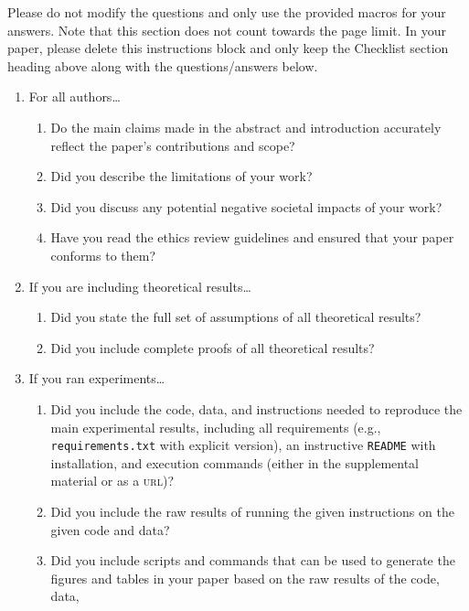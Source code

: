 \documentclass[11pt]{article}
\begin{document}
Please do not modify the questions and only use the provided macros for your
answers. Note that this section does not count towards the page limit. In your
paper, please delete this instructions block and only keep the Checklist section
heading above along with the questions/answers below.
\begin{enumerate}
\item For all authors\dots
  \begin{enumerate}
  \item Do the main claims made in the abstract and introduction accurately
    reflect the paper's contributions and scope?
    \answerTODO{}
  \item Did you describe the limitations of your work?
    \answerTODO{}
  \item Did you discuss any potential negative societal impacts of your work?
    \answerTODO{}
  \item Have you read the ethics review guidelines and ensured that your paper
    conforms to them?
    \answerTODO{}
  \end{enumerate}
\item If you are including theoretical results\dots
  \begin{enumerate}
  \item Did you state the full set of assumptions of all theoretical results?
    \answerTODO{}
  \item Did you include complete proofs of all theoretical results?
    \answerTODO{}
  \end{enumerate}
\item If you ran experiments\dots
  \begin{enumerate}
  \item Did you include the code, data, and instructions needed to reproduce the
    main experimental results, including all requirements (e.g.,
    \texttt{requirements.txt} with explicit version), an instructive
    \texttt{README} with installation, and execution commands (either in the
    supplemental material or as a \textsc{url})?
    \answerTODO{}
  \item Did you include the raw results of running the given instructions on the
    given code and data?
    \answerTODO{}
  \item Did you include scripts and commands that can be used to generate the
    figures and tables in your paper based on the raw results of the code, data,

\end{enumerate}
\end{enumerate}
\end{document}
